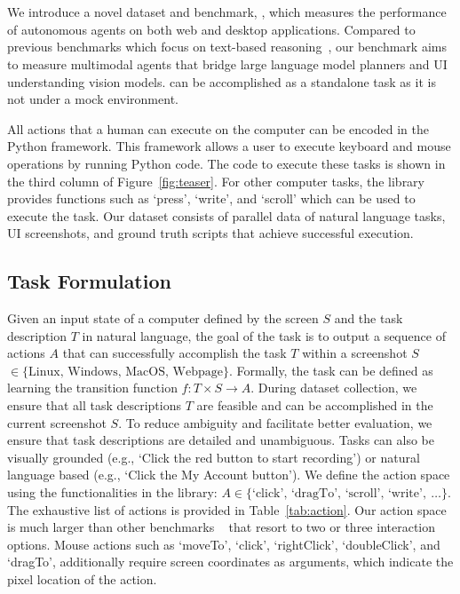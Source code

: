 \section{\ModelName{}}

We introduce a novel dataset and benchmark, \ModelName{}, which measures the performance of autonomous agents on both web and desktop applications. Compared to previous benchmarks which focus on text-based reasoning~\cite{shi2017world,zhou2023webarena,deng2023mind2web, yao2022webshop, humphreys2022data}, our benchmark aims to measure multimodal agents that bridge large language model planners and UI understanding vision models. \ModelName{} can be accomplished as a standalone task as it is not under a mock environment. 

All actions that a human can execute on the computer can be encoded in the \textit{\pyautogui}~\cite{PyAutoGUI} Python framework. This framework allows a user to execute keyboard and mouse operations by running Python code. The \textit{\pyautogui} code to execute these tasks is shown in the third column of Figure~\ref{fig:teaser}. For other computer tasks, the \textit{\pyautogui} library provides functions such as `press', `write', and `scroll' which can be used to execute the task. Our dataset consists of parallel data of natural language tasks, UI screenshots, and ground truth \textit{\pyautogui} scripts that achieve successful execution.

\subsection{Task Formulation}

Given an input state of a computer defined by the screen $S$ and the task description $T$ in natural language, the goal of the task is to output a sequence of actions $A$ that can successfully accomplish the task $T$ within a screenshot $S$ $\in \{\text{Linux, Windows, MacOS, Webpage}\}$. Formally, the task can be defined as learning the transition function $f: T \times S \rightarrow A$. During dataset collection, we ensure that all task descriptions $T$ are feasible and can be accomplished in the current screenshot $S$. To reduce ambiguity and facilitate better evaluation, we ensure that task descriptions are detailed and unambiguous. Tasks can also be visually grounded (e.g., `Click the red button to start recording') or natural language based (e.g., `Click the My Account button'). We define the action space using the functionalities in the \textit{\pyautogui} library: $A \in \{\text{`click', `dragTo', `scroll', `write'}, \ \ldots \}$. The exhaustive list of actions is provided in Table~\ref{tab:action}. Our action space is much larger than other benchmarks ~\cite{shi2017world,deng2023mind2web,zhou2023webarena} that resort to two or three interaction options. Mouse actions such as `moveTo', `click', `rightClick', `doubleClick', and `dragTo', additionally require screen coordinates as arguments, which indicate the pixel location of the action. 

